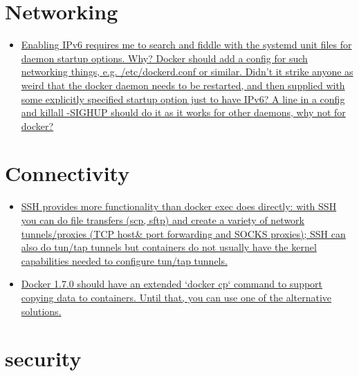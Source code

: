 \section{Networking}

\begin{itemize}

\item \href{%
https://groups.google.com/forum/#!topic/docker-user/TgCGntvTAjs
}{%
Enabling IPv6 requires me to search and fiddle with the systemd unit files for daemon startup options. Why? Docker should add a config for such networking things, e.g. /etc/dockerd.conf or similar. Didn't it strike anyone as weird that the docker daemon needs to be restarted, and then supplied with some explicitly specified startup option just to have IPv6? A line in a config and killall -SIGHUP should do it as it works for other daemons, why not for docker?
}

\end{itemize}

\section{Connectivity}
\begin{itemize}

\item \href{%
https://developer.ibm.com/bluemix/2015/11/18/docker-workaround-lack-of-network-connectivity-between-client-and-container/
}{%
SSH provides more functionality than docker exec does directly: with SSH you can do file transfers (scp, sftp) and create a variety of network tunnels/proxies (TCP host\& port forwarding and SOCKS proxies); SSH can also do tun/tap tunnels but containers do not usually have the kernel capabilities needed to configure tun/tap tunnels.}

\item \href{%
https://medium.com/@gchudnov/copying-data-between-docker-containers-26890935da3f#.1qil6fc2j
}{%
Docker 1.7.0 should have an extended `docker cp` command to support copying data to containers. Until that, you can use one of the alternative solutions.
}
\end{itemize}


\section{security}


